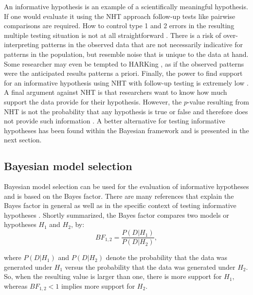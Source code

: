 \documentclass[11pt,reqno]{article}
\begin{document}
An informative hypothesis is an example of a scientifically meaningful hypothesis. If one would evaluate it using the NHT approach follow-up tests like pairwise comparisons are required. How to control type 1 and 2 errors in the resulting multiple testing situation is not at all straightforward \autocite[e.g.,][]{maxwell_persistence_2004}. There is a risk of over-interpreting patterns in the observed data that are not necessarily indicative for patterns in the population, but resemble noise that is unique to the data at hand. Some researcher may even be tempted to HARKing \autocite[Hypothesizing After Results are Known;][]{kerr_harking_1998}, as if the observed patterns were the anticipated results patterns a priori. Finally, the power to find support for an informative hypothesis using NHT with follow-up testing is extremely low \autocite{klugkist_confirmatory_2014}.
A final argument against NHT is that researchers want to know how much support the data provide for their hypothesis. However, the $p$-value resulting from NHT is not the probability that any hypothesis is true or false and therefore does not provide such information \autocite[e.g.,][]{cohen_earth_1994}. A better alternative for testing informative hypotheses has been found within the Bayesian framework and is presented in the next section.




\subsection{Bayesian model selection}
\label{BMS}

Bayesian model selection can be used for the evaluation of informative hypotheses and is based on the Bayes factor. There are many references that explain the Bayes factor in general \autocite{kass_raftery_bayes_factors_1995, hoijtink_tutorial_2019, heck_review_2022} as well as in the specific context of testing informative hypotheses \autocite[e.g.,][]{beland2012informative, klugkist_inequality_2005, gu_inequality_2014, hoijtink_informative_2012}. Shortly summarized, the Bayes factor compares two models or hypotheses $H_1$ and $H_2$, by:
\begin{equation*}
  BF_{1,2} = \frac{P(D|H_1)}{P(D|H_2)},
\end{equation*}

\noindent where $P(D|H_1)$ and $P(D|H_2)$ denote the probability that the data was generated under $H_1$ versus the probability that the data was generated under $H_2$. So, when the resulting value is larger than one, there is more support for $H_1$, whereas $BF_{1,2}<1$ implies more support for $H_2$.
\end{document}
